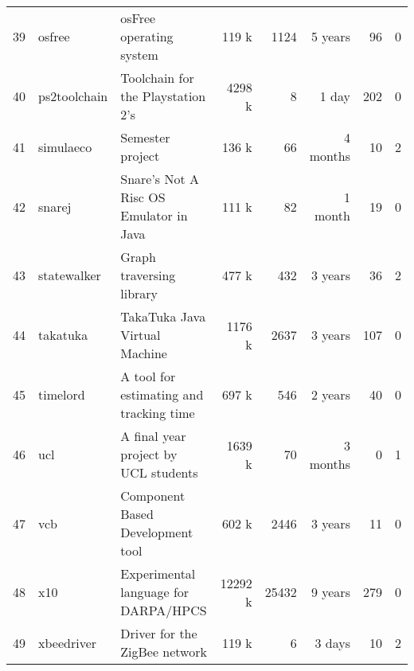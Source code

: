 \begin{table*}[htb]
\begin{tabularx}{\textwidth}{|r|l|X|r|r|r|r|r|}
  39 & osfree & osFree operating system & 119 k & 1124 & 5 years &  96 &   0 \\ 
  40 & ps2toolchain & Toolchain for the Playstation 2's & 4298 k &   8 & 1 day & 202 &   0 \\ 
  41 & simulaeco & Semester project & 136 k &  66 & 4 months &  10 &   2 \\ 
  42 & snarej & Snare's Not A Risc OS Emulator in Java & 111 k &  82 & 1 month &  19 &   0 \\ 
  43 & statewalker & Graph traversing library & 477 k & 432 & 3 years &  36 &   2 \\ 
  44 & takatuka & TakaTuka Java Virtual Machine & 1176 k & 2637 & 3 years & 107 &   0 \\ 
  45 & timelord & A tool for estimating and tracking time & 697 k & 546 & 2 years &  40 &   0 \\ 
  46 & ucl & A final year project by UCL students & 1639 k &  70 & 3 months &   0 &   1 \\ 
  47 & vcb & Component Based Development tool & 602 k & 2446 & 3 years &  11 &   0 \\ 
  48 & x10 & Experimental language for DARPA/HPCS & 12292 k & 25432 & 9 years & 279 &   0 \\ 
  49 & xbeedriver & Driver for the ZigBee network & 119 k &   6 & 3 days &  10 &   2 \\ 
   \hline
\end{tabularx}
\end{table*}
